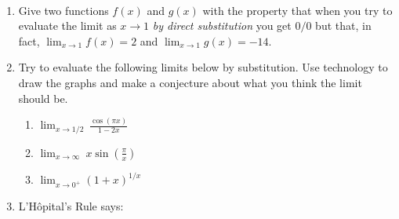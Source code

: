 \documentclass[11pt,fleqn]{article}
\begin{document}
\vspace*{-0.7in}

\begin{center}
  \Large{}\\
\end{center}
\begin{enumerate}
\item Give two functions $f(x)$ and $g(x)$ with the property that when you try to evaluate  the limit as $x \to 1$ \emph{by direct substitution} you get $0/0$  but that, in fact, $\displaystyle{\lim_{x\to 1} f(x)=2}$ and $\displaystyle{\lim_{x\to 1} g(x)=-14}.$
\vspace{2in}
\item Try to evaluate the following limits below by substitution. Use technology to draw the graphs and make a conjecture about what you think the limit should be. 
	\begin{enumerate}
	\item $\displaystyle{\lim_{x\to 1/2}\: \frac{\cos(\pi x)}{1-2x}}$\\
	\vfill
	\item $\displaystyle{\lim_{x\to \infty}\: x \sin(\frac{\pi}{x})}$\\
	\vfill
	\item $\displaystyle{\lim_{x\to 0^+} \left(1+x \right)^{1/x}}$\\
	\vfill
	\end{enumerate}
	\newpage
\item L'H\^{o}pital's Rule says: 
\end{enumerate}
\end{document}
